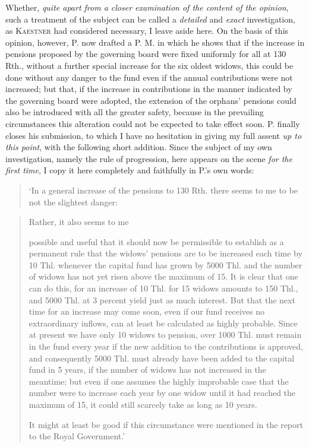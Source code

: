 Whether, \textit{quite apart from a closer examination of the content of the opinion}, such a treatment of the subject can be called a \textit{detailed} and \textit{exact} investigation, as \textsc{Kaestner} had considered necessary, I leave aside here. On the basis of this opinion, however, P. now drafted a P. M. in which he shows that if the increase in pensions proposed by the governing board were fixed uniformly for all at 130 Rth., without a further special increase for the six oldest widows, this could be done without any danger to the fund even if the annual contributions were not increased; but that, if the increase in contributions in the manner indicated by the governing board were adopted, the extension of the orphans' pensions could also be introduced with all the greater safety, because in the prevailing circumstances this alteration could not be expected to take effect soon. P. finally closes his submission, to which I have no hesitation in giving my full assent \textit{up to this point}, with the following short addition. Since the subject of my own investigation, namely the rule of progression, here appears on the scene \textit{for the first time}, I copy it here completely and faithfully in P.'s own words:

\begin{quote}
‘In a general increase of the pensions to 130 Rth. there seems to me to be not the slightest danger:
\end{quote}
\begin{quote}
Rather, it also seems to me
\begin{list}{}{\setlength{\leftmargin}{1.8em}\setlength{\labelwidth}{1.4em}\setlength{\labelsep}{.4em}}
\item[3)] possible and useful that it should now be permissible to establish as a permanent rule that the widows' pensions are to be increased each time by 10 Thl. whenever the capital fund has grown by 5000 Thl. and the number of widows has not yet risen above the maximum of 15. It is clear that one can do this, for an increase of 10 Thl. for 15 widows amounts to 150 Thl., and 5000 Thl. at 3 percent yield just as much interest. But that the next time for an increase may come soon, even if our fund receives no extraordinary inflows, can at least be calculated as highly probable. Since at present we have only 10 widows to pension, over 1000 Thl. must remain in the fund every year if the new addition to the contributions is approved, and consequently 5000 Thl. must already have been added to the capital fund in 5 years, if the number of widows has not increased in the meantime; but even if one assumes the highly improbable case that the number were to increase each year by one widow until it had reached the maximum of 15, it could still scarcely take as long as 10 years.
\end{list}
It might at least be good if this circumstance were mentioned in the report to the Royal Government.’
\end{quote}

